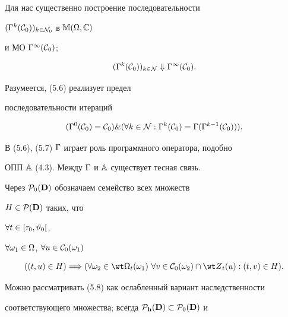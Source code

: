 Для нас существенно построение последовательности


$({{\Gamma}^k}({\cal C}_0))_{k \in {{\cal N}_0}}$ в ${\Bbb M}(\Omega,{\Bbb C})$


и МО ${{\Gamma}^\infty}({\cal C}_0)$;


\begin{equation}


{({{\Gm}^k}({\cal C}_0))_{k \in {\cal N}}} \Downarrow


{{\Gm}^\infty}({\cal C}_0).


\end{equation}


Разумеется, (5.6) реализует предел


последовательности итераций


\begin{equation}


({{\Gm}^0}({\cal C}_0) = {{\cal C}_0}) \& (\fo{k} \in {\cal N}:


{{\Gm}^k}({\cal C}_0) = {\Gm}({{\Gm}^{k-1}}({\cal C}_0))).


\end{equation}


В (5.6), (5.7) $\Gamma$ играет роль программного оператора, подобно


ОПП ${\Bbb A}$ (4.3). Между $\Gamma$ и ${\Bbb A}$ существует тесная связь.





Через ${{\cal P}_0}({\bold D})$ обозначаем семейство всех множеств


$H \in {{\cal P}({\bold D})}$ таких, что


$\forall{t} \in [{{\tau}_0},{{\vartheta}_0}[$,


$\forall{{\omega}_1} \in \Omega$, $\forall{u} \in {{\cal C}_0}({\omega}_1)$


\begin{equation}


((t,u) \in H) \Lo (\fo{{\omega}_2} \in {{\wt \Om}_t}({\omega}_1)


\ \fo{v} \in {{\cal C}_0}({\omega}_2) \cap {{\wt Z}_t}(u):


(t,v) \in H).


\end{equation}


Можно рассматривать (5.8) как ослабленный вариант наследственности


соответствующего множества; всегда ${{\cal P}_{\bold h}}({\bold D}) \subset


{{\cal P}_0}({\bold D})$ и


